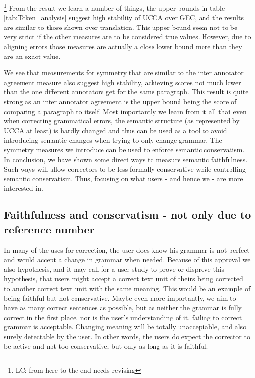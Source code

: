 \documentclass[letter,11pt]{article}
\newcommand{\lc}[1]{\footnote{\color{green}LC: #1}}
\begin{document}
		
		\lc{from here to the end needs revising}
		From the result we learn a number of things, the upper
		bounds in table \ref{tab:Token_analysis} suggest high stability of UCCA over GEC, and the results are similar to those shown over
		translation. This upper bound seem not to be very strict if the other
		measures are to be considered true values. 
		However, due to aligning errors those measures are actually a close lower bound more than they are an exact value.
		
		We see that measurements for symmetry that are similar to the inter
		annotator agreement measure also suggest high stability, achieving
		scores not much lower than the one different annotators get for the
		same paragraph. This result is quite strong as an inter annotator
		agreement is the upper bound being the score of comparing a paragraph to itself. 
		Most importantly we learn from it all that even when correcting grammatical errors, the semantic structure (as represented by UCCA at least) is hardly changed and thus can be used as a tool to avoid introducing semantic changes when trying to only change grammar. 
		The symmetry measures we introduce can be used to enforce semantic conservatism.
		In conclusion, we have shown some direct ways to measure
		semantic faithfulness. Such ways will allow correctors to be less formally conservative while controlling semantic conservatism. Thus, focusing on what users - and hence we - are more interested in.
		
		\subsection{Faithfulness and conservatism - not only due to reference number}
		In many of the uses for correction,
		the user does know his grammar is not perfect and would accept
		a change in grammar when needed. Because of this approval we also
		hypothesis, and it may call for a user study to prove or disprove
		this hypothesis, that users might accept a correct text unit of theirs
		being corrected to another correct text unit with the same meaning.
		This would be an example of being faithful but not conservative.
		Maybe even more importantly, we aim to have as many correct sentences
		as possible, but as neither the grammar is fully correct in the first place,
		nor is the user's understanding of it, failing to correct grammar
		is acceptable. Changing meaning will be totally unacceptable, and
		also surely detectable by the user. In other words, the users do expect
		the corrector to be active and not too conservative, but
		only as long as it is faithful. 
		
\end{document}
